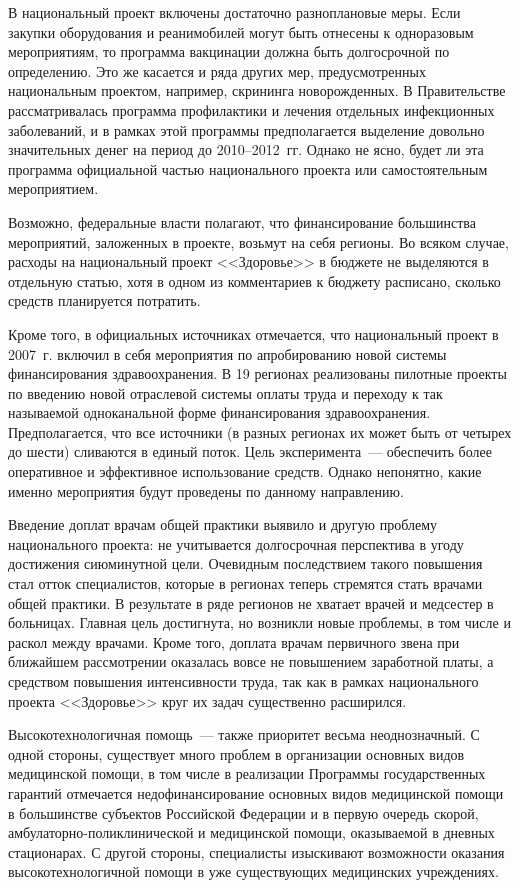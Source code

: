 \documentclass[article, 12pt, russian, oneside]{ncc}
\begin{document}
В национальный проект включены достаточно разноплановые меры. Если
закупки оборудования и реанимобилей могут быть отнесены к одноразовым
мероприятиям, то программа вакцинации должна быть долгосрочной по
определению. Это же касается и ряда других мер, предусмотренных
национальным проектом, например, скрининга новорожденных. В
Правительстве рассматривалась программа профилактики и лечения
отдельных инфекционных заболеваний, и в рамках этой программы
предполагается выделение довольно значительных денег на период до
2010--2012~гг. Однако не ясно, будет ли эта программа официальной
частью национального проекта или самостоятельным мероприятием.
     
Возможно, федеральные власти полагают, что финансирование большинства
мероприятий, заложенных в проекте, возьмут на себя регионы.  Во всяком
случае, расходы на национальный проект <<Здоровье>> в бюджете не
выделяются в отдельную статью, хотя в одном из комментариев к бюджету
расписано, сколько средств планируется потратить.
     
Кроме того, в официальных источниках отмечается, что национальный
проект в 2007~г. включил в себя мероприятия по апробированию новой
системы финансирования здравоохранения. В 19 регионах реализованы
пилотные проекты по введению новой отраслевой системы оплаты труда и
переходу к так называемой одноканальной форме финансирования
здравоохранения. Предполагается, что все источники (в разных регионах
их может быть от четырех до шести) сливаются в единый поток. Цель
эксперимента~--- обеспечить более оперативное и эффективное
использование средств. Однако непонятно, какие именно мероприятия
будут проведены по данному направлению.

Введение доплат врачам общей практики выявило и другую проблему
национального проекта: не учитывается долгосрочная перспектива в угоду
достижения сиюминутной цели. Очевидным последствием такого повышения
стал отток специалистов, которые в регионах теперь стремятся стать
врачами общей практики. В результате в ряде регионов не хватает врачей
и медсестер в больницах. Главная цель достигнута, но возникли новые
проблемы, в том числе и раскол между врачами. Кроме того, доплата
врачам первичного звена при ближайшем рассмотрении оказалась вовсе не
повышением заработной платы, а средством повышения интенсивности
труда, так как в рамках национального проекта <<Здоровье>> круг их
задач существенно расширился.

Высокотехнологичная помощь~--- также приоритет весьма неоднозначный. С
одной стороны, существует много проблем в организации основных видов
медицинской помощи, в том числе в реализации Программы государственных
гарантий отмечается недофинансирование основных видов медицинской
помощи в большинстве субъектов Российской Федерации и в первую очередь
скорой, амбулаторно-поликлинической и медицинской помощи, оказываемой
в дневных стационарах. С другой стороны, специалисты изыскивают
возможности оказания высокотехнологичной помощи в уже существующих
медицинских учреждениях.
\newpage
\end{document}
